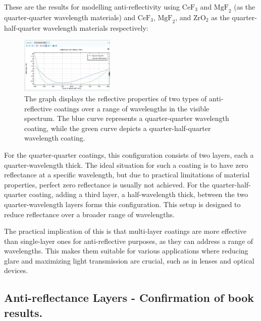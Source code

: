 These are the results for modelling anti-reflectivity using $\text{CeF}_3$ and $\text{MgF}_2$ (as the quarter-quarter wavelength materials) and $\text{CeF}_3$, $\text{MgF}_2$, and $\text{ZrO}_2$ as the quarter-half-quarter wavelength materials respectively:

\begin{figure}[ht!]
  \centering
  \includegraphics[width=0.4\textwidth]{Chapters/Figures/Chapter 4 Figures/Quarter-Half-Quarter.png}
  \caption{The graph displays the reflective properties of two types of anti-reflective coatings over a range of wavelengths in the visible spectrum. The blue curve represents a quarter-quarter wavelength coating, while the green curve depicts a quarter-half-quarter wavelength coating.}
  \label{fig:both quarter-quarter and quarter-half-quarter}
\end{figure}

For the quarter-quarter coatings, this configuration consists of two layers, each a quarter-wavelength thick. The ideal situation for such a coating is to have zero reflectance at a specific wavelength, but due to practical limitations of material properties, perfect zero reflectance is usually not achieved. For the quarter-half-quarter coating, adding a third layer, a half-wavelength thick, between the two quarter-wavelength layers forms this configuration. This setup is designed to reduce reflectance over a broader range of wavelengths.

The practical implication of this is that multi-layer coatings are more effective than single-layer ones for anti-reflective purposes, as they can address a range of wavelengths. This makes them suitable for various applications where reducing glare and maximizing light transmission are crucial, such as in lenses and optical devices.


\subsection{Anti-reflectance Layers - Confirmation of book results.}

